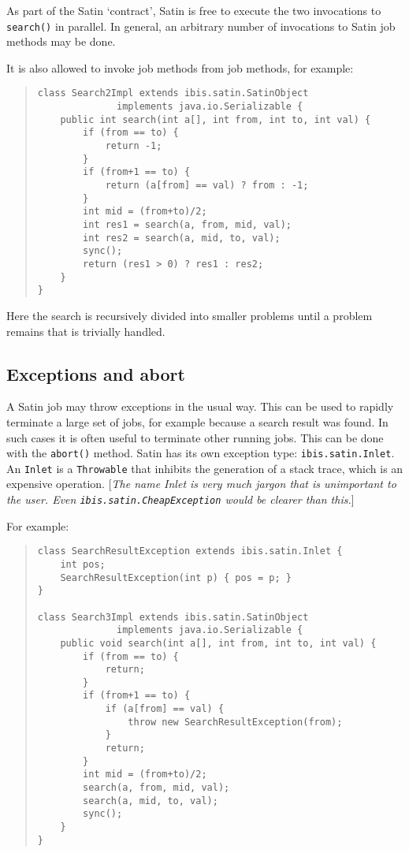 \documentclass[10pt]{article}
\newcommand{\mysubsection}[1]{\subsection{#1}\label{#1}}
\newcommand{\remark}[1]{[\emph{#1}]}
\begin{document}
As part of the Satin `contract', Satin is free to execute the two
invocations to \verb+search()+ in parallel.
In general, an arbitrary number of
invocations to Satin job methods may be done.

It is also allowed to invoke job methods from job methods, for example:

\begin{quote}
\begin{verbatim}
class Search2Impl extends ibis.satin.SatinObject
              implements java.io.Serializable {
    public int search(int a[], int from, int to, int val) {
        if (from == to) {
            return -1;
        }
        if (from+1 == to) {
            return (a[from] == val) ? from : -1;
        }
        int mid = (from+to)/2;
        int res1 = search(a, from, mid, val);
        int res2 = search(a, mid, to, val);
        sync();
        return (res1 > 0) ? res1 : res2;
    }
}
\end{verbatim}
\end{quote}
\noindent
Here the search is recursively divided into smaller problems until
a problem remains that is trivially handled.

\mysubsection{Exceptions and abort}

A Satin job may throw exceptions in the usual way. This can be used
to rapidly terminate a large set of jobs, for example because a search
result was found. In such cases it is often useful to terminate other
running jobs.  This can be done with the \verb+abort()+ method.  Satin has
its own exception type: \verb+ibis.satin.Inlet+.  An \verb+Inlet+ is a
\verb+Throwable+ that inhibits the generation of a stack trace, which
is an expensive operation.  \remark{The name Inlet is very much jargon
that is unimportant to the user. Even \texttt{ibis.satin.CheapException}
would be clearer than this.}

For example:

\begin{quote}
\begin{verbatim}
class SearchResultException extends ibis.satin.Inlet {
    int pos;
    SearchResultException(int p) { pos = p; }
}

class Search3Impl extends ibis.satin.SatinObject
              implements java.io.Serializable {
    public void search(int a[], int from, int to, int val) {
        if (from == to) {
            return;
        }
        if (from+1 == to) {
            if (a[from] == val) {
                throw new SearchResultException(from);
            }
            return;
        }
        int mid = (from+to)/2;
        search(a, from, mid, val);
        search(a, mid, to, val);
        sync();
    }
}
\end{verbatim}
\end{quote}
\end{document}
